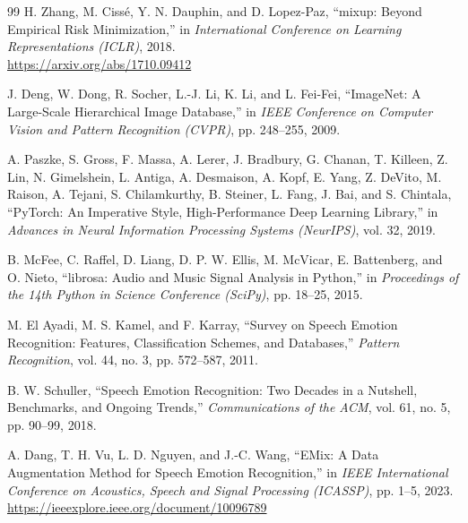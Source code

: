 \begin{thebibliography}{99}
H. Zhang, M. Cissé, Y. N. Dauphin, and D. Lopez-Paz,
``mixup: Beyond Empirical Risk Minimization,''
in \textit{International Conference on Learning Representations (ICLR)}, 2018.
\\ \url{https://arxiv.org/abs/1710.09412}

J. Deng, W. Dong, R. Socher, L.-J. Li, K. Li, and L. Fei-Fei,
``ImageNet: A Large-Scale Hierarchical Image Database,''
in \textit{IEEE Conference on Computer Vision and Pattern Recognition (CVPR)}, pp. 248--255, 2009.

A. Paszke, S. Gross, F. Massa, A. Lerer, J. Bradbury, G. Chanan, T. Killeen, Z. Lin, N. Gimelshein, L. Antiga, A. Desmaison, A. Kopf, E. Yang, Z. DeVito, M. Raison, A. Tejani, S. Chilamkurthy, B. Steiner, L. Fang, J. Bai, and S. Chintala,
``PyTorch: An Imperative Style, High-Performance Deep Learning Library,''
in \textit{Advances in Neural Information Processing Systems (NeurIPS)}, vol. 32, 2019.

B. McFee, C. Raffel, D. Liang, D. P. W. Ellis, M. McVicar, E. Battenberg, and O. Nieto,
``librosa: Audio and Music Signal Analysis in Python,''
in \textit{Proceedings of the 14th Python in Science Conference (SciPy)}, pp. 18--25, 2015.

M. El Ayadi, M. S. Kamel, and F. Karray,
``Survey on Speech Emotion Recognition: Features, Classification Schemes, and Databases,''
\textit{Pattern Recognition}, vol. 44, no. 3, pp. 572--587, 2011.

B. W. Schuller,
``Speech Emotion Recognition: Two Decades in a Nutshell, Benchmarks, and Ongoing Trends,''
\textit{Communications of the ACM}, vol. 61, no. 5, pp. 90--99, 2018.

A. Dang, T. H. Vu, L. D. Nguyen, and J.-C. Wang,
``EMix: A Data Augmentation Method for Speech Emotion Recognition,''
in \textit{IEEE International Conference on Acoustics, Speech and Signal Processing (ICASSP)}, pp. 1--5, 2023.
\\ \url{https://ieeexplore.ieee.org/document/10096789}

\end{thebibliography}
